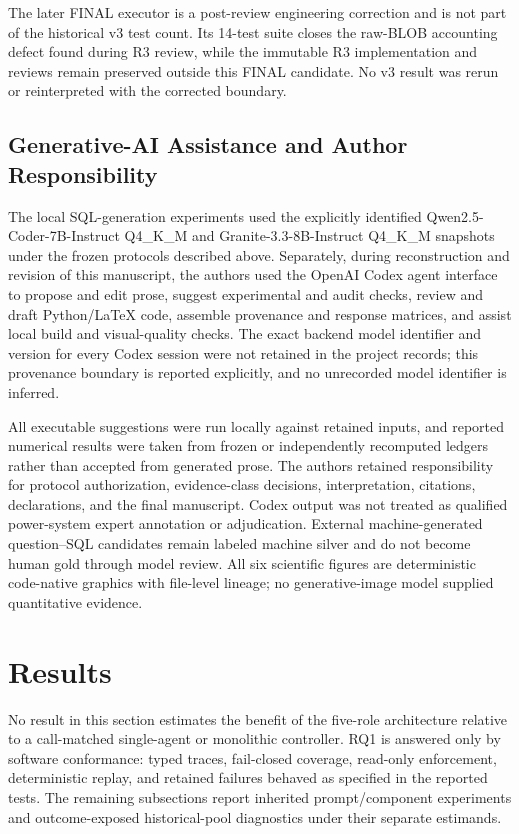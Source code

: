 \documentclass[applsci,article,submit,moreauthors]{Definitions/mdpi}
\begin{document}
The later FINAL executor is a post-review engineering correction and is not part of the historical v3 test count. Its 14-test suite closes the raw-BLOB accounting defect found during R3 review, while the immutable R3 implementation and reviews remain preserved outside this FINAL candidate. No v3 result was rerun or reinterpreted with the corrected boundary.

\subsection{Generative-AI Assistance and Author Responsibility}

The local SQL-generation experiments used the explicitly identified Qwen2.5-Coder-7B-Instruct Q4\_K\_M and Granite-3.3-8B-Instruct Q4\_K\_M snapshots under the frozen protocols described above. Separately, during reconstruction and revision of this manuscript, the authors used the OpenAI Codex agent interface to propose and edit prose, suggest experimental and audit checks, review and draft Python/\LaTeX{} code, assemble provenance and response matrices, and assist local build and visual-quality checks. The exact backend model identifier and version for every Codex session were not retained in the project records; this provenance boundary is reported explicitly, and no unrecorded model identifier is inferred.

All executable suggestions were run locally against retained inputs, and reported numerical results were taken from frozen or independently recomputed ledgers rather than accepted from generated prose. The authors retained responsibility for protocol authorization, evidence-class decisions, interpretation, citations, declarations, and the final manuscript. Codex output was not treated as qualified power-system expert annotation or adjudication. External machine-generated question--SQL candidates remain labeled machine silver and do not become human gold through model review. All six scientific figures are deterministic code-native graphics with file-level lineage; no generative-image model supplied quantitative evidence.

\section{Results}

No result in this section estimates the benefit of the five-role architecture relative to a call-matched single-agent or monolithic controller. RQ1 is answered only by software conformance: typed traces, fail-closed coverage, read-only enforcement, deterministic replay, and retained failures behaved as specified in the reported tests. The remaining subsections report inherited prompt/component experiments and outcome-exposed historical-pool diagnostics under their separate estimands.
\end{document}

